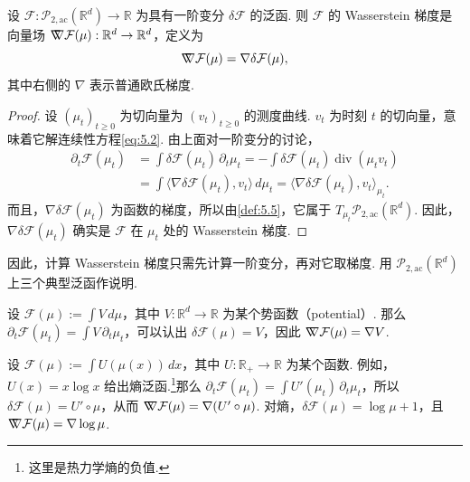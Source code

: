 \begin{proposition}\label{prop:5.10}
设 $\mathcal F:\mathcal P_{2,\mathrm{ac}}(\mathbb R^d)\to\mathbb R$ 为具有一阶变分 $\delta\mathcal F$ 的泛函. 则 $\mathcal F$ 的 Wasserstein 梯度是向量场 $\nabla\mkern-10mu\nabla\mathcal F(\mu):\mathbb R^d\to\mathbb R^d$，定义为
$$
\nabla\mkern-10mu\nabla\mathcal F(\mu)=\nabla\delta\mathcal F(\mu),
$$
其中右侧的 $\nabla$ 表示普通欧氏梯度.
\end{proposition}
\begin{proof}
设 $(\mu_t)_{t\geq0}$ 为切向量为 $(v_t)_{t\geq0}$ 的测度曲线. $v_t$ 为时刻 $t$ 的切向量，意味着它解连续性方程\eqref{eq:5.2}. 由上面对一阶变分的讨论，
$$
\begin{aligned}
\partial_t\mathcal F(\mu_t)
&=\int\delta\mathcal F(\mu_t)\,\partial_t\mu_t
=-\int\delta\mathcal F(\mu_t)\operatorname{div}(\mu_tv_t)\\
&=\int\langle\nabla\delta\mathcal F(\mu_t),v_t\rangle\,d\mu_t
=\langle\nabla\delta\mathcal F(\mu_t),v_t\rangle_{\mu_t}.
\end{aligned}
$$
而且，$\nabla\delta\mathcal F(\mu_t)$ 为函数的梯度，所以由\autoref{def:5.5}，它属于 $T_{\mu_t}\mathcal P_{2,\mathrm{ac}}(\mathbb R^d)$. 因此，$\nabla\delta\mathcal F(\mu_t)$ 确实是 $\mathcal F$ 在 $\mu_t$ 处的 Wasserstein 梯度.
\end{proof}

因此，计算 Wasserstein 梯度只需先计算一阶变分，再对它取梯度. 用 $\mathcal P_{2,\mathrm{ac}}(\mathbb R^d)$ 上三个典型泛函作说明.

\begin{example}[势能]\label{ex:5.11}
设 $\mathcal F(\mu):=\int V\,d\mu$，其中 $V:\mathbb R^d\to\mathbb R$ 为某个势函数（potential）. 那么 $\partial_t\mathcal F(\mu_t)=\int V\,\partial_t\mu_t$，可以认出 $\delta\mathcal F(\mu)=V$，因此 $\nabla\mkern-10mu\nabla\mathcal F(\mu)=\nabla V$.
\end{example}

\begin{example}[内能]\label{ex:5.12}
设 $\mathcal F(\mu):=\int U(\mu(x))\,dx$，其中 $U:\mathbb R_+\to\mathbb R$ 为某个函数. 例如，$U(x)=x\log x$ 给出熵泛函.\footnote{这里是热力学熵的负值.}那么 $\partial_t\mathcal F(\mu_t)=\int U'(\mu_t)\,\partial_t\mu_t$，所以 $\delta\mathcal F(\mu)=U'\circ\mu$，从而 $\nabla\mkern-10mu\nabla\mathcal F(\mu)=\nabla(U'\circ\mu)$. 对熵，$\delta\mathcal F(\mu)=\log\mu+1$，且 $\nabla\mkern-10mu\nabla\mathcal F(\mu)=\nabla\log\mu$.
\end{example}

